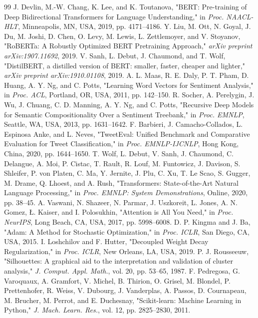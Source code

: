 \documentclass[conference]{IEEEtran}
\begin{document}
\begin{thebibliography}{99}
J. Devlin, M.-W. Chang, K. Lee, and K. Toutanova, "BERT: Pre-training of Deep Bidirectional Transformers for Language Understanding," in \textit{Proc. NAACL-HLT}, Minneapolis, MN, USA, 2019, pp. 4171–4186.
Y. Liu, M. Ott, N. Goyal, J. Du, M. Joshi, D. Chen, O. Levy, M. Lewis, L. Zettlemoyer, and V. Stoyanov, "RoBERTa: A Robustly Optimized BERT Pretraining Approach," \textit{arXiv preprint arXiv:1907.11692}, 2019.
V. Sanh, L. Debut, J. Chaumond, and T. Wolf, "DistilBERT, a distilled version of BERT: smaller, faster, cheaper and lighter," \textit{arXiv preprint arXiv:1910.01108}, 2019.
A. L. Maas, R. E. Daly, P. T. Pham, D. Huang, A. Y. Ng, and C. Potts, "Learning Word Vectors for Sentiment Analysis," in \textit{Proc. ACL}, Portland, OR, USA, 2011, pp. 142–150.
R. Socher, A. Perelygin, J. Wu, J. Chuang, C. D. Manning, A. Y. Ng, and C. Potts, "Recursive Deep Models for Semantic Compositionality Over a Sentiment Treebank," in \textit{Proc. EMNLP}, Seattle, WA, USA, 2013, pp. 1631–1642.
F. Barbieri, J. Camacho-Collados, L. Espinosa Anke, and L. Neves, "TweetEval: Unified Benchmark and Comparative Evaluation for Tweet Classification," in \textit{Proc. EMNLP-IJCNLP}, Hong Kong, China, 2020, pp. 1644–1650.
T. Wolf, L. Debut, V. Sanh, J. Chaumond, C. Delangue, A. Moi, P. Cistac, T. Rault, R. Louf, M. Funtowicz, J. Davison, S. Shleifer, P. von Platen, C. Ma, Y. Jernite, J. Plu, C. Xu, T. Le Scao, S. Gugger, M. Drame, Q. Lhoest, and A. Rush, "Transformers: State-of-the-Art Natural Language Processing," in \textit{Proc. EMNLP: System Demonstrations}, Online, 2020, pp. 38–45.
A. Vaswani, N. Shazeer, N. Parmar, J. Uszkoreit, L. Jones, A. N. Gomez, Ł. Kaiser, and I. Polosukhin, "Attention is All You Need," in \textit{Proc. NeurIPS}, Long Beach, CA, USA, 2017, pp. 5998–6008.
D. P. Kingma and J. Ba, "Adam: A Method for Stochastic Optimization," in \textit{Proc. ICLR}, San Diego, CA, USA, 2015.
I. Loshchilov and F. Hutter, "Decoupled Weight Decay Regularization," in \textit{Proc. ICLR}, New Orleans, LA, USA, 2019.
P. J. Rousseeuw, "Silhouettes: A graphical aid to the interpretation and validation of cluster analysis," \textit{J. Comput. Appl. Math.}, vol. 20, pp. 53–65, 1987.
F. Pedregosa, G. Varoquaux, A. Gramfort, V. Michel, B. Thirion, O. Grisel, M. Blondel, P. Prettenhofer, R. Weiss, V. Dubourg, J. Vanderplas, A. Passos, D. Cournapeau, M. Brucher, M. Perrot, and E. Duchesnay, "Scikit-learn: Machine Learning in Python," \textit{J. Mach. Learn. Res.}, vol. 12, pp. 2825–2830, 2011.

\end{thebibliography}
\end{document}
